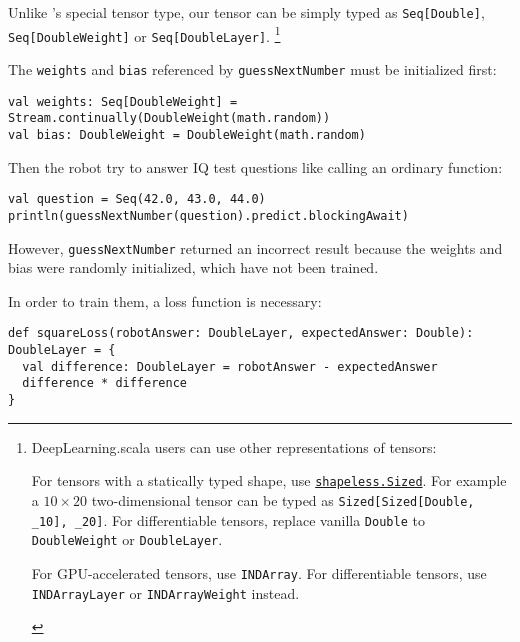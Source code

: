 Unlike \cite{chen2017typesafe}'s special tensor type, our tensor can be simply typed as \lstinline{Seq[Double]}, \lstinline{Seq[DoubleWeight]} or \lstinline{Seq[DoubleLayer]}.
\footnote{DeepLearning.scala users can use other representations of tensors:
\begin{enumerate*}
  \item For tensors with a statically typed shape, use \href{https://javadoc.io/page/com.chuusai/shapeless_2.11/latest/shapeless/Sized.html}{ \lstinline{shapeless.Sized}}. For example a $10\times20$ two-dimensional tensor can be typed as \lstinline{Sized[Sized[Double, _10], _20]}. For differentiable tensors, replace vanilla \lstinline{Double} to \lstinline{DoubleWeight} or \lstinline{DoubleLayer}.
  \item For GPU-accelerated tensors, use \lstinline{INDArray}\cite{skymind2017nd4j}. For differentiable tensors, use \lstinline{INDArrayLayer} or \lstinline{INDArrayWeight} instead.
\end{enumerate*}
}

The \lstinline{weights} and \lstinline{bias} referenced by \lstinline{guessNextNumber} must be initialized first:

\begin{lstlisting}[caption={Weight initialization}]
val weights: Seq[DoubleWeight] = Stream.continually(DoubleWeight(math.random))
val bias: DoubleWeight = DoubleWeight(math.random)
\end{lstlisting}

Then the robot try to answer IQ test questions like calling an ordinary function:

\begin{lstlisting}[caption={Inference on an untrained model}]
val question = Seq(42.0, 43.0, 44.0)
println(guessNextNumber(question).predict.blockingAwait)
\end{lstlisting}

However, \lstinline{guessNextNumber} returned an incorrect result because the weights and bias were randomly initialized, which have not been trained.

In order to train them, a loss function is necessary:

\begin{lstlisting}[caption={The differentiable square loss function},label={squareLoss}]
def squareLoss(robotAnswer: DoubleLayer, expectedAnswer: Double): DoubleLayer = {
  val difference: DoubleLayer = robotAnswer - expectedAnswer
  difference * difference
}
\end{lstlisting}

